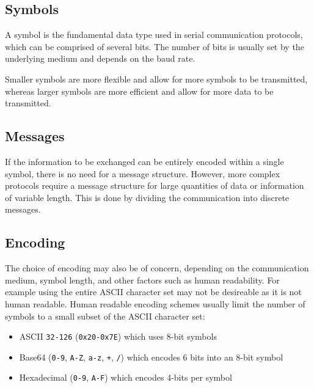 \documentclass{report}
\begin{document}
\subsection{Symbols}
A symbol is the fundamental data type used in serial communication
protocols, which can be comprised of several bits. The number of bits
is usually set by the underlying medium and depends on the baud rate.

Smaller symbols are more flexible and allow for more symbols to be
transmitted, whereas larger symbols are more efficient and allow for
more data to be transmitted.
\subsection{Messages}
If the information to be exchanged can be entirely encoded within a
single symbol, there is no need for a message structure. However, more
complex protocols require a message structure for large quantities of
data or information of variable length. This is done by dividing the
communication into discrete messages.
\subsection{Encoding}
The choice of encoding may also be of concern, depending on the
communication medium, symbol length, and other factors such as human
readability. For example using the entire ASCII character set may not
be desireable as it is not human readable. Human readable encoding
schemes usually limit the number of symbols to a small subset of the
ASCII character set:
\begin{itemize}
    \item ASCII \texttt{32-126} (\texttt{0x20-0x7E})
          which uses 8-bit symbols %
    \item Base64 (\texttt{0-9}, \texttt{A-Z},
          \texttt{a-z}, \texttt{+}, \texttt{/})
          which encodes 6 bits into an 8-bit symbol %
    \item Hexadecimal (\texttt{0-9}, \texttt{A-F}) which
          encodes 4-bits per symbol %
\end{itemize}
\end{document}
